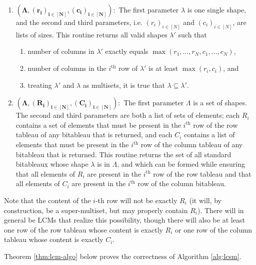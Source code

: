 \documentclass[11pt,reqno]{amsart}
\theoremstyle{definition}
\numberwithin{equation}{section}
\begin{document}
\begin{enumerate}
\item \getadsh$\bm{\left(\Lambda, (r_i)_{i \in [N]}, (c_i)_{i \in [N]}\right)}:$ The first parameter $\lambda$ is one single shape, and the second and third parameters, i.e. $(r_i)_{i \in [N]}$ and $(c_i)_{i \in [N]}$, are lists of sizes. This routine returns all valid shapes $\lambda'$ such that
\begin{enumerate}
\item number of columns in $\lambda'$ exactly equals $\max(r_1, \ldots, r_N, c_1, \ldots, c_N)$,
\item number of columns in the $i^{\text{th}}$ row of $\lambda'$ is at least $\max(r_i, c_i)$, and
\item treating $\lambda'$ and $\lambda$ as multisets, it is true that $\lambda \subseteq \lambda'$.
\end{enumerate}

\item \getadsbd$\bm{\left(\Lambda, (R_i)_{i \in [N]}, (C_i)_{i \in [N]}\right)}:$ The first parameter $\Lambda$ is a set of shapes. The second and third parameters are both a list of sets of elements; each $R_i$ contains a set of elements that must be present in the $i^{\text{th}}$ row of the row tableau of any bitableau that is returned, and each $C_i$ contains a list of elements that must be present in the $i^{\text{th}}$ row of the column tableau of any bitableau that is returned. This routine returns the set of all standard bitableaux whose shape $\lambda$ is in $\Lambda$, and which can be formed while ensuring that all elements of $R_i$ are present in the $i^{\text{th}}$ row of the row tableau and that all elements of $C_i$ are present in the $i^{\text{th}}$ row of the column bitableau.
\end{enumerate}

\begin{remark}
Note that the content of the $i$-th row will not be exactly $R_i$ (it will, by construction, be a super-multiset, but may properly contain $R_i$). There will in general be LCMs that realize this possibility, though there will also be at least one row of the row tableau whose content is exactly $R_i$ or one row of the column tableau whose content is exactly $C_i$.
\end{remark}

Theorem \ref{thm:lcm-algo} below proves the correctness of Algorithm \ref{alg:lcsm}.

\newcommand{\lambdaf}{\lambda^{(f)}}
\newcommand{\lambdag}{\lambda^{(g)}}
\newcommand{\lambdalcm}{\Lambda^{(lcm)}}
\end{document}
